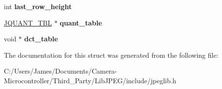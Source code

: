 \begin{DoxyCompactItemize}
int {\bfseries last\+\_\+row\+\_\+height}
\item 
\mbox{\label{structjpeg__component__info_a80162a15110c2ee40fd756b6a1b45d36}} 
\hyperlink{struct_j_q_u_a_n_t___t_b_l}{J\+Q\+U\+A\+N\+T\+\_\+\+T\+BL} $\ast$ {\bfseries quant\+\_\+table}
\item 
\mbox{\label{structjpeg__component__info_a25f382eb5bb6c69db739d4648a8f06df}} 
void $\ast$ {\bfseries dct\+\_\+table}
\end{DoxyCompactItemize}


The documentation for this struct was generated from the following file\+:\begin{DoxyCompactItemize}
\item 
C\+:/\+Users/\+James/\+Documents/\+Camera-\/\+Microcontroller/\+Third\+\_\+\+Party/\+Lib\+J\+P\+E\+G/include/jpeglib.\+h\end{DoxyCompactItemize}
